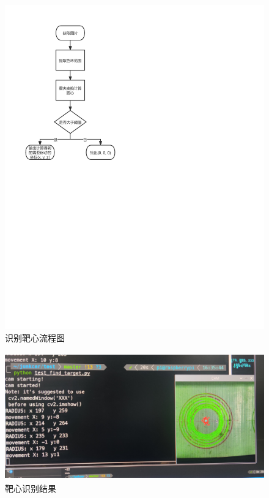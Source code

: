 \documentclass[a4paper,11pt,UTF8]{ctexart}
\begin{document}
\begin{figure}[htbp]
  \centering
  \includegraphics{识别靶心.pdf}
  \caption{识别靶心流程图}\label{fig_Target}
\end{figure}


\begin{figure}[htbp]
  \begin{center}
      \centering
      \includegraphics[height=5.5cm]{detect_tar.jpg}
      \caption{靶心识别结果}\label{fig_det_tar}
  \end{center}
\end{figure}
\end{document}

